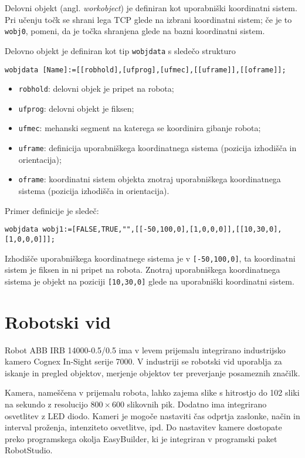 Delovni objekt (angl. \emph{workobject}) je definiran kot uporabniški koordinatni sistem. Pri učenju točk se shrani lega TCP glede na izbrani koordinatni sistem; če je to \verb"wobj0", pomeni, da je točka shranjena glede na bazni koordinatni sistem.

Delovno objekt je definiran kot tip \verb"wobjdata" s sledečo strukturo
{\small
\begin{verbatim}
wobjdata [Name]:=[[robhold],[ufprog],[ufmec],[[uframe]],[[oframe]];
\end{verbatim}
}
\begin{itemize}
  \item \verb"robhold": delovni objek je pripet na robota;
  \item \verb"ufprog": delovni objekt je fiksen;
  \item \verb"ufmec": mehanski segment na katerega se koordinira gibanje robota;
  \item \verb"uframe": definicija uporabniškega koordinatnega sistema (pozicija izhodišča in orientacija);
  \item \verb"oframe": koordinatni sistem objekta znotraj uporabniškega koordinatnega sistema (pozicija izhodišča in orientacija).
\end{itemize}

Primer definicije je sledeč:
{\small
\begin{verbatim}
wobjdata wobj1:=[FALSE,TRUE,"",[[-50,100,0],[1,0,0,0]],[[10,30,0],[1,0,0,0]]];
\end{verbatim}
}
Izhodišče uporabniškega koordinatnege sistema je v \verb"[-50,100,0]", ta koordinatni sistem je fiksen in ni pripet na robota. Znotraj uporabniškega koordinatnega sistema je objekt na poziciji \verb"[10,30,0]" glede na uporabniški koordinatni sistem.

\section{Robotski vid}

Robot ABB IRB 14000-0.5/0.5 ima v levem prijemalu integrirano industrijsko kamero Cognex In-Sight serije 7000. V industriji se robotski vid uporablja za iskanje in pregled objektov, merjenje objektov ter preverjanje posameznih značilk.

Kamera, nameščena v prijemalu robota, lahko zajema slike s hitrostjo do 102 sliki na sekundo z resolucijo $800 \times 600$ slikovnih pik. Dodatno ima integrirano osvetlitev z LED diodo. Kameri je mogoče nastaviti čas odprtja zaslonke, način in interval proženja, intenziteto osvetlitve, ipd. Do nastavitev kamere dostopate preko programskega okolja EasyBuilder, ki je integriran v programski paket RobotStudio.

